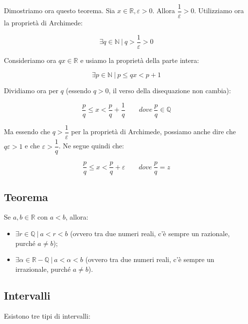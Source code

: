 \documentclass{article}
\begin{document}
\noindent Dimostriamo ora questo teorema. Sia $x \in \mathbb{R}, \varepsilon > 0$. Allora $\dfrac{1}{\varepsilon} > 0$. Utilizziamo ora la proprietà di Archimede:

\begin{equation*}
    \exists q \in \mathbb{N} \ | \ q > \frac{1}{\varepsilon} > 0
\end{equation*}

\noindent Consideriamo ora $qx \in \mathbb{R}$ e usiamo la proprietà della parte intera: 

\begin{equation*}
    \exists p \in \mathbb{N} \ | \ p \leq qx < p + 1
\end{equation*}

\noindent Dividiamo ora per $q$ (essendo $q > 0$, il verso della disequazione non cambia): 

\begin{equation*}
    \frac{p}{q} \leq x < \frac{p}{q} + \frac{1}{q} \qquad dove \ \frac{p}{q} \in \mathbb{Q}
\end{equation*}

\noindent Ma essendo che $q > \dfrac{1}{\varepsilon}$ per la proprietà di Archimede, possiamo anche dire che $q\varepsilon > 1$ e che $\varepsilon > \dfrac{1}{q}$. Ne segue quindi che: 

\begin{equation*}
    \frac{p}{q} \leq x < \frac{p}{q} + \varepsilon \qquad dove \ \frac{p}{q} = z
\end{equation*}

\subsection{Teorema}
Se $a, b \in \mathbb{R}$ con $a < b$, allora: 

\begin{itemize}
    \item $\exists r \in \mathbb{Q} \ | \ a < r < b$ (ovvero tra due numeri reali, c'è sempre un razionale, purché $a \neq b$);
    \item $\exists \alpha \in \mathbb{R} - \mathbb{Q} \ | \ a < \alpha < b$ (ovvero tra due numeri reali, c'è sempre un irrazionale, purché $a \neq b$).
\end{itemize}

\subsection{Intervalli}
Esistono tre tipi di intervalli: 
\end{document}
